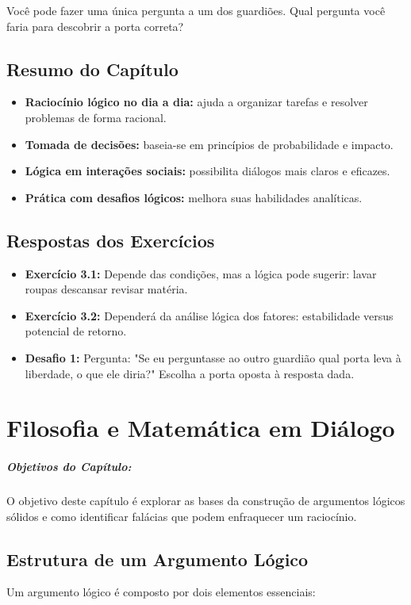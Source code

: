 \documentclass[a4paper,12pt]{book}
\begin{document}
Você pode fazer uma única pergunta a um dos guardiões. Qual pergunta você faria para descobrir a porta correta?

\newpage

\section*{Resumo do Capítulo}
\begin{itemize}
\item \textbf{Raciocínio lógico no dia a dia:} ajuda a organizar tarefas e resolver problemas de forma racional.
\item \textbf{Tomada de decisões:} baseia-se em princípios de probabilidade e impacto.
\item \textbf{Lógica em interações sociais:} possibilita diálogos mais claros e eficazes.
\item \textbf{Prática com desafios lógicos:} melhora suas habilidades analíticas.
\end{itemize}

\section*{Respostas dos Exercícios}
\begin{itemize}
\item \textbf{Exercício 3.1:} Depende das condições, mas a lógica pode sugerir: lavar roupas  descansar  revisar matéria.
\item \textbf{Exercício 3.2:} Dependerá da análise lógica dos fatores: estabilidade versus potencial de retorno.
\item \textbf{Desafio 1:} Pergunta: "Se eu perguntasse ao outro guardião qual porta leva à liberdade, o que ele diria?" Escolha a porta oposta à resposta dada.
\end{itemize}


\chapter{Filosofia e Matemática em Diálogo}

\paragraph{Objetivos do Capítulo:} O objetivo deste capítulo é explorar as bases da construção de argumentos lógicos sólidos e como identificar falácias que podem enfraquecer um raciocínio. 

\section{Estrutura de um Argumento Lógico}
Um argumento lógico é composto por dois elementos essenciais:
\end{document}
